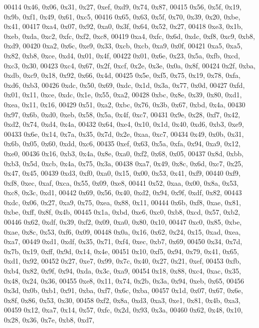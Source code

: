 \begin{DoxyCode}
00414   0x46, 0x06, 0x31, 0x27, 0xef, 0xd9, 0x74, 0x87,
00415   0x56, 0x5f, 0x19, 0x9b, 0xf1, 0x49, 0x61, 0xc5,
00416   0x65, 0x63, 0x5f, 0x70, 0x39, 0x20, 0xbe, 0x41,
00417   0xa4, 0x07, 0x92, 0xa0, 0x3f, 0x64, 0x52, 0x27,
00418   0xe3, 0x1b, 0xeb, 0xda, 0xc2, 0xfc, 0xf2, 0xc8,
00419   0xa4, 0xfc, 0x6d, 0xdc, 0xf8, 0xc9, 0xb8, 0xd9,
00420   0xa2, 0x6c, 0xe9, 0x33, 0xcb, 0xcb, 0xa9, 0x0f,
00421   0xa5, 0xa5, 0x82, 0xb8, 0xce, 0xd4, 0x01, 0x4f,
00422   0x01, 0x6e, 0x23, 0x5a, 0xfb, 0xcd, 0xc3, 0x30,
00423   0xc4, 0x67, 0x2f, 0xcf, 0x2e, 0x3e, 0x0a, 0x8f,
00424   0x2f, 0xba, 0xdb, 0xc9, 0x18, 0x92, 0x66, 0x4d,
00425   0x5e, 0xf5, 0x75, 0x19, 0x78, 0xfa, 0xd6, 0xb3,
00426   0xdc, 0x50, 0x69, 0xdc, 0x1d, 0x3a, 0x77, 0x0d,
00427   0xfd, 0x01, 0x11, 0xce, 0xdc, 0x1e, 0x55, 0xa2,
00428   0xbc, 0x8e, 0x39, 0x80, 0xd1, 0xea, 0x11, 0x16,
00429   0x51, 0xa2, 0xbc, 0x76, 0x3b, 0x67, 0xbd, 0x4a,
00430   0x97, 0x6b, 0xd0, 0xeb, 0x58, 0x5a, 0x4f, 0xc7,
00431   0x9e, 0x28, 0xf7, 0x42, 0xd2, 0x74, 0xd4, 0x4a,
00432   0x64, 0xe4, 0x10, 0x1d, 0x40, 0xd6, 0xb3, 0xe9,
00433   0x6e, 0x14, 0x7a, 0x35, 0x7d, 0x2e, 0xaa, 0xc7,
00434   0x49, 0x0b, 0x31, 0x6b, 0x05, 0x60, 0xdd, 0xc6,
00435   0xef, 0x63, 0x5a, 0xfa, 0x94, 0xa9, 0x12, 0xe0,
00436   0x16, 0xb3, 0x4a, 0x8e, 0xa0, 0xf2, 0x68, 0x05,
00437   0x8d, 0xbb, 0xb3, 0x5d, 0xcb, 0x4a, 0x75, 0x3a,
00438   0xa7, 0x49, 0x8c, 0x6d, 0xc7, 0x25, 0x47, 0x45,
00439   0xd3, 0xf0, 0xa0, 0x15, 0x00, 0x53, 0x41, 0xf9,
00440   0xf9, 0xf8, 0xec, 0xaf, 0xca, 0x55, 0x09, 0xe8,
00441   0x52, 0xaa, 0x00, 0x8a, 0x53, 0xc8, 0x3c, 0xd1,
00442   0x69, 0x56, 0x40, 0xd2, 0x94, 0x9f, 0xdf, 0x82,
00443   0xdc, 0x06, 0x27, 0xa9, 0x75, 0xea, 0x88, 0x11,
00444   0x6b, 0xf8, 0xae, 0x81, 0xbe, 0xff, 0x8f, 0x4b,
00445   0x1a, 0xbd, 0xe6, 0xc0, 0xb8, 0xcd, 0x57, 0xb2,
00446   0x62, 0xdf, 0x39, 0xf2, 0x09, 0xa0, 0x80, 0x10,
00447   0xc0, 0x85, 0xbe, 0xae, 0x8c, 0x53, 0xf6, 0x09,
00448   0x0a, 0x16, 0x62, 0x24, 0x15, 0xad, 0xea, 0xa7,
00449   0xd1, 0xdf, 0x35, 0x71, 0xf4, 0xec, 0xb7, 0x69,
00450   0x34, 0x7d, 0x7b, 0x19, 0xff, 0x9d, 0x14, 0x4e,
00451   0x10, 0xf5, 0x94, 0x79, 0x41, 0x65, 0xd1, 0x92,
00452   0x27, 0xe7, 0x99, 0x7c, 0x40, 0x27, 0x21, 0xef,
00453   0xfb, 0xb4, 0x82, 0x9f, 0x94, 0xda, 0x3c, 0xa9,
00454   0x18, 0x88, 0xc4, 0xac, 0x35, 0x48, 0x24, 0x36,
00455   0xe8, 0x11, 0x74, 0x2b, 0x3a, 0x94, 0xeb, 0x65,
00456   0x3d, 0x0b, 0xb1, 0x91, 0xba, 0xf7, 0x6c, 0xba,
00457   0x1d, 0x07, 0x67, 0x6e, 0x8f, 0x86, 0x53, 0x30,
00458   0xf2, 0x8a, 0xd3, 0xa3, 0xe1, 0x81, 0x4b, 0xa3,
00459   0x12, 0xa7, 0x14, 0x57, 0xfc, 0x2d, 0x93, 0x3a,
00460   0x62, 0x48, 0x10, 0x28, 0x36, 0x7e, 0xb8, 0xd7,

\end{DoxyCode}
